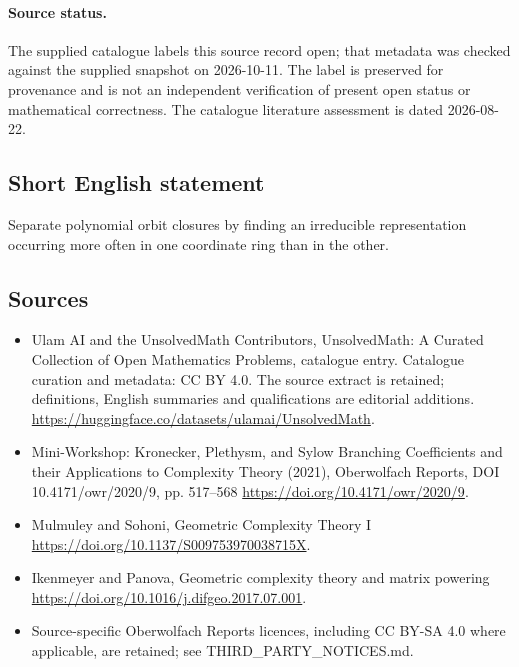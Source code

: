 \documentclass[11pt]{article}
\begin{document}
\paragraph{Source status.}
The supplied catalogue labels this source record open; that metadata was checked against the supplied snapshot on 2026-10-11. The label is preserved for provenance and is not an independent verification of present open status or mathematical correctness. The catalogue literature assessment is dated 2026-08-22.
\subsection{Short English statement}
Separate polynomial orbit closures by finding an irreducible representation occurring more often in one coordinate ring than in the other.
\subsection{Sources}
\begin{itemize}
\item[\hypertarget{source:statement:1}{S1}] Ulam AI and the UnsolvedMath Contributors, UnsolvedMath: A Curated Collection of Open Mathematics Problems, catalogue entry. Catalogue curation and metadata: CC BY 4.0. The source extract is retained; definitions, English summaries and qualifications are editorial additions.
\url{https://huggingface.co/datasets/ulamai/UnsolvedMath}.
\item[\hypertarget{source:statement:2}{S2}] Mini-Workshop: Kronecker, Plethysm, and Sylow Branching Coefficients and their Applications to Complexity Theory (2021), Oberwolfach Reports, DOI 10.4171/owr/2020/9, pp. 517--568
\url{https://doi.org/10.4171/owr/2020/9}.
\item[\hypertarget{source:statement:3}{S3}] Mulmuley and Sohoni, Geometric Complexity Theory I
\url{https://doi.org/10.1137/S009753970038715X}.
\item[\hypertarget{source:statement:4}{S4}] Ikenmeyer and Panova, Geometric complexity theory and matrix powering
\url{https://doi.org/10.1016/j.difgeo.2017.07.001}.
\item Source-specific Oberwolfach Reports licences, including CC BY-SA 4.0 where applicable, are retained; see THIRD\_PARTY\_NOTICES.md.
\end{itemize}
\end{document}
